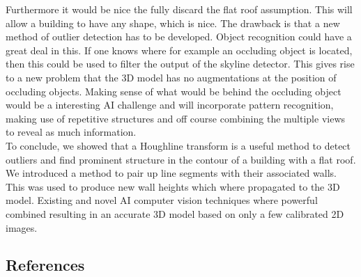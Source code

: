\documentclass[10pt]{article}
\begin{document}
Furthermore it would be nice the fully discard the flat roof assumption. This will allow a building to have any shape, which is nice. The drawback is that a new method of outlier detection has to be developed. Object recognition could have a great deal in this. If one knows where for example an occluding object is located, then this could be used to filter the output of the skyline detector. This gives rise to a new problem that the 3D model has no augmentations at the position of occluding objects. Making sense of what would be behind the occluding object would be a interesting AI challenge and will incorporate pattern recognition, making use of repetitive structures and off course combining the multiple views to reveal as much information.\\

To conclude, we showed that a Houghline transform is a useful method to detect outliers and find prominent structure in the contour of a building with a flat roof. We introduced a method to pair up line segments with their associated walls. This was used to produce new wall heights which where propagated to the 3D model.
Existing and novel AI computer vision techniques where powerful combined resulting in an accurate 3D model based on only a few calibrated 2D images. 


\subsection{References}




\end{document}
